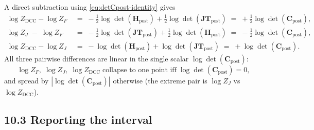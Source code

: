 \documentclass[11pt]{article}
\begin{document}
A direct subtraction using \eqref{eq:detCpost-identity} gives
\begin{align}
\log Z_{\mathrm{DCC}} - \log Z_F
\;&=\;
-\tfrac{1}{2}\log\det(\mathbf H_{\mathrm{post}})
+ \tfrac{1}{2}\log\det(\mathbf{JT}_{\mathrm{post}})
\;=\;
+\tfrac{1}{2}\log\det(\mathbf C_{\mathrm{post}}),
\label{eq:ZDCC-minus-ZF}\\[4pt]
\log Z_J \;-\; \log Z_F
\;&=\;
-\tfrac{1}{2}\log\det(\mathbf{JT}_{\mathrm{post}})
+ \tfrac{1}{2}\log\det(\mathbf H_{\mathrm{post}})
\;=\;
-\tfrac{1}{2}\log\det(\mathbf C_{\mathrm{post}}),
\label{eq:ZJ-minus-ZF}\\[4pt]
\log Z_{\mathrm{DCC}} - \log Z_J
\;&=\;
-\log\det(\mathbf H_{\mathrm{post}})
+ \log\det(\mathbf{JT}_{\mathrm{post}})
\;=\;
+\log\det(\mathbf C_{\mathrm{post}}).
\label{eq:ZDCC-minus-ZJ}
\end{align}
All three pairwise differences are linear in the single scalar
$\log\det(\mathbf C_{\mathrm{post}})$:
\begin{equation}
\log Z_F,\;\log Z_J,\;\log Z_{\mathrm{DCC}}
\;\text{collapse to one point iff}\;
\log\det(\mathbf C_{\mathrm{post}}) = 0,
\label{eq:collapse-iff}
\end{equation}
and spread by $|\log\det(\mathbf C_{\mathrm{post}})|$ otherwise (the extreme pair is
$\log Z_J$ vs $\log Z_{\mathrm{DCC}}$).

\subsection*{10.3 Reporting the interval}
\end{document}
